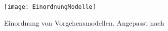 \begin{figure}
\centering
    \texttt{[image: EinordnungModelle]} 
    \caption{Einordnung von Vorgehensmodellen. Angepasst nach \cite{Shiklo:2019:8-Vorgehensmodelle:12}}
    \label{fig:modelleEinor}
\end{figure}




